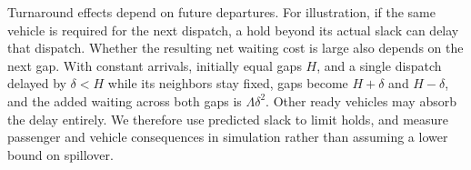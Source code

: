 Turnaround effects depend on future departures. For illustration, if the same vehicle is required for the next dispatch, a hold beyond its actual slack can delay that dispatch. Whether the resulting net waiting cost is large also depends on the next gap. With constant arrivals, initially equal gaps $H$, and a single dispatch delayed by $\delta<H$ while its neighbors stay fixed, gaps become $H+\delta$ and $H-\delta$, and the added waiting across both gaps is $\Lambda\delta^2$. Other ready vehicles may absorb the delay entirely. We therefore use predicted slack to limit holds, and measure passenger and vehicle consequences in simulation rather than assuming a lower bound on spillover.

